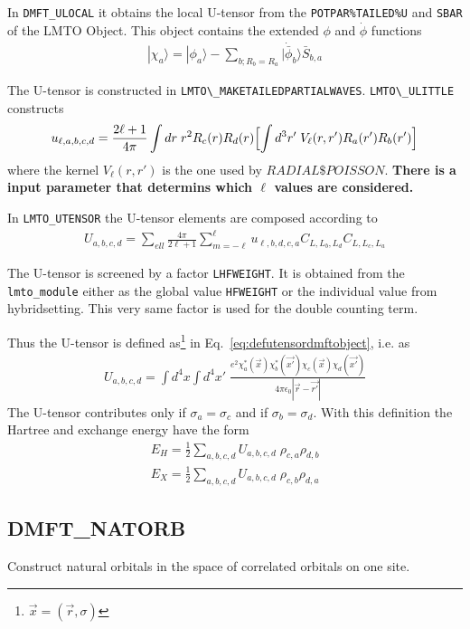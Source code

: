 \documentclass[11pt,a4paper]{report}
\begin{document}
In \verb|DMFT_ULOCAL| it obtains the local U-tensor from the
\verb|POTPAR%TAILED%U| and \verb|SBAR| of the LMTO Object. This object
contains the extended $\phi$ and $\dot{\phi}$ functions
\begin{eqnarray}
|\chi_a\rangle=|\phi_a\rangle-
\sum_{b; R_b=R_a}|\dot{\bar{\phi}}_b\rangle \bar{S}_{b,a}
\end{eqnarray}


The U-tensor is constructed in \verb|LMTO\_MAKETAILEDPARTIALWAVES|.
\verb|LMTO\_ULITTLE| constructs
\begin{eqnarray}
u_{\ell,a,b,c,d}
=\frac{2\ell+1}{4\pi}
\int dr\; r^2R_c(r)R_d(r)\Bigl[\int d^3r'\;V_\ell(r,r')R_a(r')R_b(r')\Bigr]
\end{eqnarray}
where the kernel $V_\ell(r,r')$ is the one used by $RADIAL\$POISSON$.
\textbf{There is a input parameter that determins which $\ell$ values are
considered.}

In \verb|LMTO_UTENSOR| the U-tensor elements are composed according to
\begin{eqnarray}
U_{a,b,c,d}=\sum_{ell}\frac{4\pi}{2\ell+1}\sum_{m=-\ell}^\ell
u_{\ell,b,d,c,a} C_{L,L_b,L_d}C_{L,L_c,L_a}
\end{eqnarray}

The U-tensor is screened by a factor \verb|LHFWEIGHT|. It is obtained
from the \verb|lmto_module| either as the global value \verb|HFWEIGHT|
or the individual value from hybridsetting. This very same factor is
used for the double counting term.

Thus the U-tensor is defined as\footnote{$\vec{x}=(\vec{r},\sigma)$}
in Eq.~\ref{eq:defutensordmftobject}, i.e. as
\begin{eqnarray}
U_{a,b,c,d}=\int d^4x\int d^4x'\;
\frac{e^2\chi^*_a(\vec{x})\chi^*_b(\vec{x'})\chi_c(\vec{x})\chi_d(\vec{x'})}
{4\pi\epsilon_0|\vec{r}-\vec{r'}|}
\end{eqnarray}
The U-tensor contributes only if $\sigma_a=\sigma_c$ and if
$\sigma_b=\sigma_d$.
With this definition the Hartree and exchange  energy have the form
\begin{eqnarray}
E_H=\frac{1}{2}\sum_{a,b,c,d}U_{a,b,c,d}\;\rho_{c,a}\rho_{d,b}
\nonumber\\
E_X=\frac{1}{2}\sum_{a,b,c,d}U_{a,b,c,d}\;\rho_{c,b}\rho_{d,a}
\end{eqnarray}


\subsection{DMFT\_NATORB}
Construct natural orbitals in the space of correlated orbitals on one
site.
\end{document}
